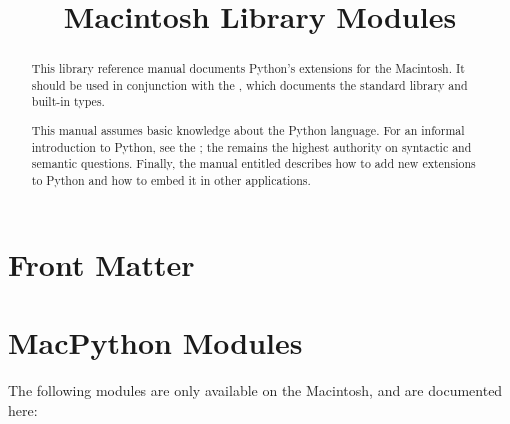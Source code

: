 \documentclass{manual}
\title{Macintosh Library Modules}
\begin{document}
\maketitle

\ifhtml
\chapter*{Front Matter\label{front}}
\fi



\begin{abstract}

\noindent
This library reference manual documents Python's extensions for the
Macintosh.  It should be used in conjunction with the
, which documents
the standard library and built-in types.

This manual assumes basic knowledge about the Python language.  For an
informal introduction to Python, see the
; the
 remains the
highest authority on syntactic and semantic questions.  Finally, the
manual entitled  describes how to add new extensions to Python
and how to embed it in other applications.

\end{abstract}

\tableofcontents




\chapter{MacPython Modules \label{macpython-modules}}

The following modules are only available on the Macintosh, and are
documented here:

\localmoduletable



%
















%
%

\renewcommand{\indexname}{Module Index}

\renewcommand{\indexname}{Index}
\end{document}
